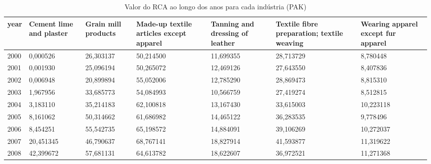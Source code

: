 \begin{table}
\centering
\caption{Valor do RCA ao longo dos anos para cada indústria (PAK)}
\begin{tabular}{p{1cm}p{2cm}p{2cm}p{2cm}p{2cm}p{2cm}p{2cm}}
\toprule
 year &  Cement lime and plaster &  Grain mill products &  Made-up textile articles except apparel &  Tanning and dressing of leather &  Textile fibre preparation; textile weaving &  Wearing apparel except fur apparel \\
\midrule
 2000 &                 0,000526 &            26,303137 &                                50,214500 &                        11,699355 &                                   28,713729 &                            8,780448 \\
 2001 &                 0,001930 &            25,096194 &                                50,265072 &                        12,469126 &                                   27,643550 &                            8,407836 \\
 2002 &                 0,006948 &            20,899894 &                                55,052006 &                        12,785290 &                                   28,869473 &                            8,815310 \\
 2003 &                 1,967956 &            33,685773 &                                54,084993 &                        10,566759 &                                   27,419274 &                            8,512815 \\
 2004 &                 3,183110 &            35,214183 &                                62,100818 &                        13,167430 &                                   33,615003 &                           10,223118 \\
 2005 &                 8,161062 &            50,314662 &                                61,686982 &                        14,465122 &                                   36,283535 &                            9,778496 \\
 2006 &                 8,454251 &            55,542735 &                                65,198572 &                        14,884091 &                                   39,106269 &                           10,272037 \\
 2007 &                20,451345 &            46,790637 &                                68,767141 &                        18,827914 &                                   41,593877 &                           11,319622 \\
 2008 &                42,399672 &            57,681131 &                                64,613782 &                        18,622607 &                                   36,972521 &                           11,271368 \\

\end{tabular}
\end{table}
